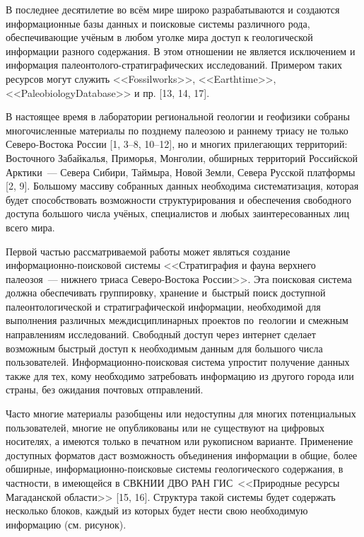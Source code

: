  

\makeProcTitle
{}

В последнее десятилетие во всём мире широко разрабатываются и создаются информационные базы данных и поисковые системы различного рода, обеспечивающие учёным в любом уголке мира доступ к геологической информации разного содержания. В этом отношении не является исключением и информация палеонтолого-стратиграфических исследований. Примером таких ресурсов могут служить <<Fossilworks>>, <<Earthtime>>, <<PaleobiologyDa\-ta\-base>> и пр. [13, 14, 17].

В настоящее время в лаборатории региональной геологии и геофизики собраны многочисленные материалы по позднему палеозою и раннему триасу не только Северо-Востока России [1, 3--8, 10--12], но и многих прилегающих территорий: Восточного Забайкалья, Приморья, Монголии, обширных территорий Российской Арктики~--- Севера Сибири, Таймыра, Новой Земли, Севера Русской платформы [2, 9]. Большому массиву собранных данных необходима систематизация, которая будет способствовать возможности структурирования и обеспечения свободного доступа большого числа учёных, специалистов и любых заинтересованных лиц всего мира.

Первой частью рассматриваемой работы может являться создание информационно-поисковой системы <<Стратиграфия и фауна верхнего палеозоя~--- нижнего триаса Северо-Востока России>>. Эта поисковая система должна обеспечивать группировку, хранение и~быстрый поиск доступной палеонтологической и стратиграфической информации, необходимой для выполнения различных междисциплинарных проектов по~геологии и смежным направлениям исследований. Свободный доступ через интернет сделает возможным быстрый доступ к необходимым данным для большого числа пользователей. Информационно-поисковая система упростит получение данных также для тех, кому необходимо затребовать информацию из другого города или страны, без ожидания почтовых отправлений.

Часто многие материалы разобщены или недоступны для многих потенциальных пользователей, многие не опубликованы или не существуют на цифровых носителях, а имеются только в печатном или рукописном варианте. Применение доступных форматов даст возможность объединения информации в общие, более обширные, информационно-поисковые системы геологического содержания, в частности, в имеющейся в СВКНИИ ДВО РАН ГИС~<<Природные ресурсы Магаданской области>> [15, 16].
Структура такой системы будет содержать несколько блоков, каждый из которых будет нести свою необходимую информацию (см. рисунок).

